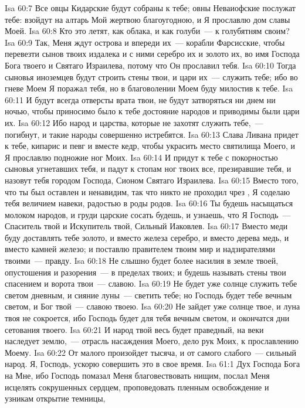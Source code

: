 \vs Isa 60:7 Все овцы Кидарские будут собраны к тебе; овны Неваиофские послужат тебе: взойдут на алтарь Мой жертвою благоугодною, и Я прославлю дом славы Моей.
\vs Isa 60:8 Кто это летят, как облака, и как голуби~--- к голубятням своим?
\vs Isa 60:9 Так, Меня ждут острова и впереди их~--- корабли Фарсисские, чтобы перевезти сынов твоих издалека и с ними серебро их и золото их, во имя Господа Бога твоего и Святаго Израилева, потому что Он прославил тебя.
\vs Isa 60:10 Тогда сыновья иноземцев будут строить стены твои, и цари их~--- служить тебе; ибо во гневе Моем Я поражал тебя, но в благоволении Моем буду милостив к тебе.
\vs Isa 60:11 И будут всегда отверсты врата твои, не будут затворяться ни днем ни ночью, чтобы приносимо было к тебе достояние народов и приводимы были цари их.
\vs Isa 60:12 Ибо народ и царства, которые не захотят служить тебе,~--- погибнут, и такие народы совершенно истребятся.
\vs Isa 60:13 Слава Ливана придет к тебе, кипарис и певг и вместе кедр, чтобы украсить место святилища Моего, и Я прославлю подножие ног Моих.
\vs Isa 60:14 И придут к тебе с покорностью сыновья угнетавших тебя, и падут к стопам ног твоих все, презиравшие тебя, и назовут тебя городом Господа, Сионом Святаго Израилева.
\vs Isa 60:15 Вместо того, что ты был оставлен и ненавидим, так что никто не проходил чрез , Я соделаю тебя величием навеки, радостью в роды родов.
\vs Isa 60:16 Ты будешь насыщаться молоком народов, и груди царские сосать будешь, и узнаешь, что Я Господь~--- Спаситель твой и Искупитель твой, Сильный Иаковлев.
\vs Isa 60:17 Вместо меди буду доставлять тебе золото, и вместо железа серебро, и вместо дерева медь, и вместо камней железо; и поставлю правителем твоим мир и надзирателями твоими~--- правду.
\vs Isa 60:18 Не слышно будет более насилия в земле твоей, опустошения и разорения~--- в пределах твоих; и будешь называть стены твои спасением и ворота твои~--- славою.
\vs Isa 60:19 Не будет уже солнце служить тебе светом дневным, и сияние луны~--- светить тебе; но Господь будет тебе вечным светом, и Бог твой~--- славою твоею.
\vs Isa 60:20 Не зайдет уже солнце твое, и луна твоя не сокроется, ибо Господь будет для тебя вечным светом, и окончатся дни сетования твоего.
\vs Isa 60:21 И народ твой весь будет праведный, на веки наследует землю,~--- отрасль насаждения Моего, дело рук Моих, к прославлению Моему.
\vs Isa 60:22 От малого произойдет тысяча, и от самого слабого~--- сильный народ. Я, Господь, ускорю совершить это в свое время.
\vs Isa 61:1 Дух Господа Бога на Мне, ибо Господь помазал Меня благовествовать нищим, послал Меня исцелять сокрушенных сердцем, проповедовать пленным освобождение и узникам открытие темницы,
